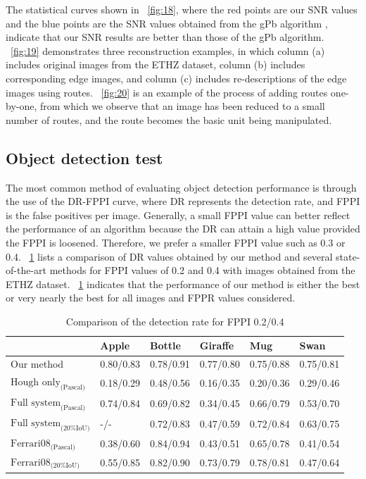 \documentclass[journal]{IEEEtran}
\begin{document}
The statistical curves shown in \figurename~\ref{fig:18}, 
where the red points are our SNR values and the blue points are the SNR values obtained from the gPb algorithm 
\cite{maire2008}, indicate that our SNR results are better than those of the gPb algorithm.
\figurename~\ref{fig:19} demonstrates three reconstruction examples,
in which column (a) includes original images from the ETHZ dataset, 
column (b) includes corresponding edge images, 
and column (c) includes re-descriptions of the edge images using routes.
\figurename~\ref{fig:20} is an example of the process of adding routes one-by-one, 
from which we observe that an image has been reduced to a small number of routes, and the route becomes the basic unit being manipulated.

\subsection{Object detection test}

The most common method of evaluating object detection performance is through the use of the DR-FPPI curve, 
where DR represents the detection rate, and FPPI is the false positives per image. 
Generally, a small FPPI value can better reflect the performance of an algorithm because the DR can attain a high value provided the FPPI is loosened. 
Therefore, we prefer a smaller FPPI value such as 0.3 or 0.4. 
\tablename~\ref{tab:1} lists a comparison of DR values obtained by our method and several state-of-the-art methods 
\cite{ferrari2010,ferrari2008} for FPPI values of 0.2 and 0.4 with images obtained from the ETHZ dataset. 
\tablename~\ref{tab:1} indicates that the performance of our method is either the best or very nearly the best for all images and FPPR values considered.
 
\begin{table}[!t]
\renewcommand{\arraystretch}{1.3}
\caption{Comparison of the detection rate for FPPI 0.2/0.4}
\label{tab:1}
\centering
\scriptsize
\begin{tabular}{l|lllll}
\hline
& Apple & Bottle & Giraffe & Mug & Swan \\
\hline
Our method
& 0.80/0.83
& 0.78/0.91
& 0.77/0.80
& 0.75/0.88
& 0.75/0.81\\
$\text{Hough only}_\text{(Pascal)}$
& 0.18/0.29
& 0.48/0.56
& 0.16/0.35
& 0.20/0.36
& 0.29/0.46\\
$\text{Full system}_\text{(Pascal)}$
& 0.74/0.84
& 0.69/0.82
& 0.34/0.45
& 0.66/0.79
& 0.53/0.70\\
$\text{Full system}_\text{(20\% IoU)}$
& -/-
& 0.72/0.83
& 0.47/0.59
& 0.72/0.84
& 0.63/0.75\\
$\text{Ferrari08}_\text{(Pascal)}$
& 0.38/0.60
& 0.84/0.94
& 0.43/0.51
& 0.65/0.78
& 0.41/0.54\\
$\text{Ferrari08}_\text{(20\% IoU)}$
& 0.55/0.85
& 0.82/0.90
& 0.73/0.79
& 0.78/0.81
& 0.47/0.64\\
\hline
\end{tabular}
\end{table}
\end{document}
